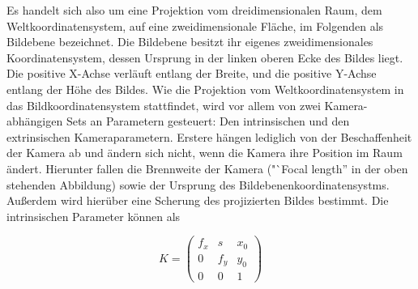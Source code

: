 Es handelt sich also um eine Projektion vom dreidimensionalen Raum, dem Weltkoordinatensystem, auf eine zweidimensionale Fläche, im Folgenden als Bildebene bezeichnet. Die Bildebene besitzt ihr eigenes zweidimensionales Koordinatensystem, dessen Ursprung in der linken oberen Ecke des Bildes liegt. Die positive X-Achse verläuft entlang der Breite, und die positive Y-Achse entlang der Höhe des Bildes. Wie die Projektion vom Weltkoordinatensystem in das Bildkoordinatensystem stattfindet, wird vor allem von zwei Kamera-abhängigen Sets an Parametern gesteuert: Den intrinsischen und den extrinsischen Kameraparametern. Erstere hängen lediglich von der Beschaffenheit der Kamera ab und ändern sich nicht, wenn die Kamera ihre Position im Raum ändert. Hierunter fallen die Brennweite der Kamera ("`Focal length'' in der oben stehenden Abbildung) sowie der Ursprung des Bildebenenkoordinatensystms. Außerdem wird hierüber eine Scherung des projizierten Bildes bestimmt. Die intrinsischen Parameter können als 

\begin{equation}
K = \begin{pmatrix}
f_x & s & x_0 \\
0 & f_y & y_0 \\
0 & 0 & 1 
\end{pmatrix}
\end{equation}

